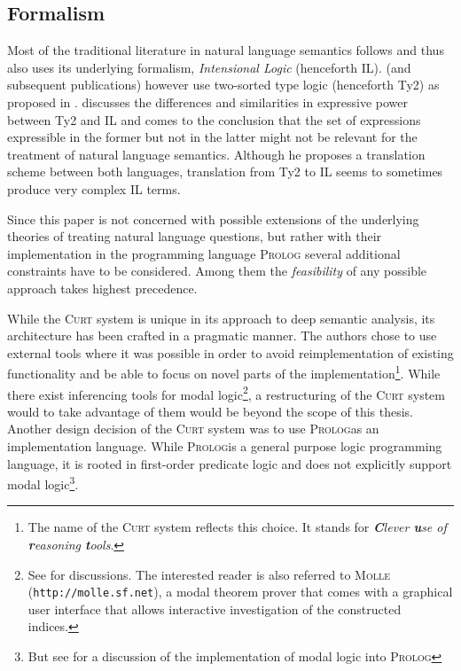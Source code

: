 \documentclass{scrartcl}
\newcommand{\abbr}{\textsf}
\newcommand{\pn}{\textsc}
\newcommand{\url}[1]{\texttt{http://#1}}
\newcommand{\prol}{\pn{Prolog}}
\begin{document}
\subsection{Formalism}\label{sec:formal}

Most of the traditional literature in natural language semantics follows
\cite{ptq} and thus also uses its underlying formalism, \emph{Intensional Logic}
(henceforth \abbr{IL}). \cite{gs:sqpa} (and subsequent publications) however use
two-sorted type logic (henceforth \abbr{Ty2}) as proposed in
\cite{gallin:ty2}. \cite{z:ilty2} discusses the differences and similarities in expressive power
between \abbr{Ty2} and \abbr{IL} and comes to the conclusion that the set of
expressions expressible in the former but not in the latter might not be
relevant for the treatment of natural language semantics. Although he proposes
a translation scheme between both languages, translation from \abbr{Ty2} to
\abbr{IL} seems to sometimes produce very complex \abbr{IL} terms.

Since this paper is not concerned with possible extensions of the underlying
theories of treating natural language questions, but rather with their
implementation in the programming language \pn{Prolog} several additional
constraints have to be considered. Among them the \emph{feasibility} of any
possible approach takes highest precedence.

While the \pn{Curt} system is unique in its approach to deep semantic analysis, its
architecture has been crafted in a pragmatic manner. The authors chose to use
external tools where it was possible in order to avoid reimplementation of
existing functionality and be able to focus on novel parts of the
implementation\footnote{The name of the \pn{Curt} system reflects this choice.
It stands for \emph{\textbf{C}lever \textbf{u}se of \textbf{r}easoning
\textbf{t}ools}.}. While there exist inferencing tools for modal
logic\footnote{See %
for discussions. The interested reader is also referred to \pn{Molle}
(\url{molle.sf.net}), a modal theorem prover that comes with a graphical user
interface that allows interactive investigation of the constructed indices.},
a restructuring of the \pn{Curt} system would to take advantage of them would be
beyond the scope of this thesis. Another design decision of the \pn{Curt} system
was to use \prol as an implementation language. While \prol is a general
purpose logic programming language, it is rooted in first-order predicate logic
and does not explicitly support modal logic\footnote{But see%
for a discussion of the implementation of modal logic into \prol}.
\end{document}
